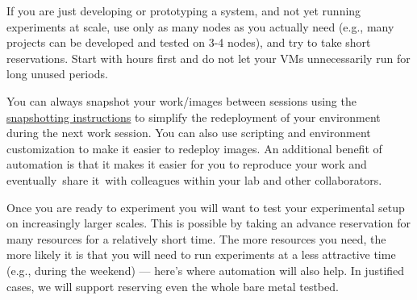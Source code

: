 \begin{description}
\item
  \item[Think Small for Development and class use:] If you are just developing or
  prototyping a system, and not yet running experiments at scale, use
  only as many nodes as you actually need (e.g., many projects can be
  developed and tested on 3-4 nodes), and try to take short
  reservations. Start with hours first and do not let your VMs
  unnecessarily run for long unused periods. 
\item
  \item[Automate deployments:] You can always snapshot your work/images
  between sessions using the
  \href{https://www.chameleoncloud.org/docs/user-guides/ironic/\#snapshotting_an_instance}{snapshotting
  instructions} to simplify the redeployment of your environment during
  the next work session. You can also use scripting and environment
  customization to make it easier to redeploy images. An additional
  benefit of automation is that it makes it easier for you to reproduce
  your work and eventually~share it~with colleagues within your lab and
  other collaborators.
\item [Think Big for Experimentation:] Once you are ready to experiment you
  will want to test your experimental setup on increasingly larger
  scales. This is possible by taking an advance reservation for many
  resources for a relatively short time. The more resources you need,
  the more likely it is that you will need to run experiments at a less
  attractive time (e.g., during the weekend) --- here's where automation
  will also help. In justified cases, we will support reserving even the
  whole bare metal testbed.
\end{description}














